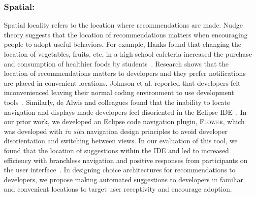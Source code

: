 \subsubsection{Spatial:} Spatial locality refers to the location where recommendations are made. Nudge theory suggests that the location of recommendations matters when encouraging people to adopt useful behaviors. For example, Hanks found that changing the location of vegetables, fruits, etc. in a high school cafeteria increased the purchase and consumption of healthier foods by students~\cite{Hanks2012Lunchroom}. Research shows that the location of recommendations matters to developers and they prefer notifications are placed in convenient locations. Johnson et al. reported that developers felt inconvenienced leaving their normal coding environment to use development tools~\cite{Johnson2013Why}. Similarly, de Alwis and colleagues found that the inability to locate navigation and displays made developers feel disoriented in the Eclipse IDE~\cite{de2006using}. In our prior work, we developed an Eclipse code navigation plugin, \textsc{Flower}, which was developed with \textit{in situ} navigation design principles to avoid developer disorientation and switching between views. In our evaluation of this tool, we found that the location of suggestions within the IDE and led to increased efficiency with branchless navigation and positive responses from participants on the user interface~\cite{Flower}. In designing choice architectures for recommendations to developers, we propose making automated suggestions to developers in familiar and convenient locations to target user receptivity and encourage adoption.


